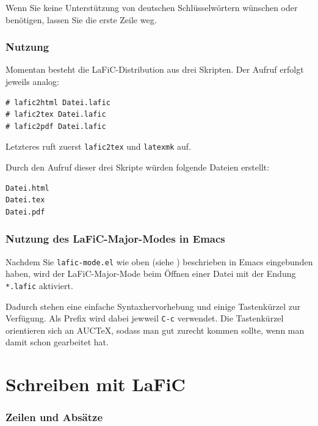 \documentclass{scrartcl}
\begin{document}
{Wenn Sie keine Unterstützung von deutschen Schlüsselwörtern
wünschen oder benötigen, lassen Sie die erste Zeile weg.\\}

\section{Nutzung}

{Momentan besteht die LaFiC-Distribution aus drei
Skripten. Der Aufruf erfolgt jeweils analog:\\}

\begin{verbatim}
# lafic2html Datei.lafic
# lafic2tex Datei.lafic
# lafic2pdf Datei.lafic
\end{verbatim}


{Letzteres ruft zuerst \texttt{lafic2tex} und \texttt{latexmk} auf.\\}

{Durch den Aufruf dieser drei Skripte würden folgende Dateien
erstellt:\\}

\begin{verbatim}
Datei.html
Datei.tex
Datei.pdf
\end{verbatim}


\section{Nutzung des LaFiC-Major-Modes in Emacs}

{Nachdem Sie \texttt{lafic-mode.el} wie oben (siehe \xspace )
beschrieben in Emacs eingebunden haben, wird der
LaFiC-Major-Mode beim Öffnen einer Datei mit der Endung
\texttt{*.lafic} aktiviert.\\}

{Dadurch stehen eine einfache Syntaxhervorhebung und einige
Tastenkürzel zur Verfügung. Als Prefix wird dabei jewweil
\texttt{C-c} verwendet. Die Tastenkürzel orientieren sich an AUCTeX,
sodass man gut zurecht kommen sollte, wenn man damit schon
gearbeitet hat.\\}

\part{Schreiben mit LaFiC}

\section{Zeilen und Absätze}
\end{document}
